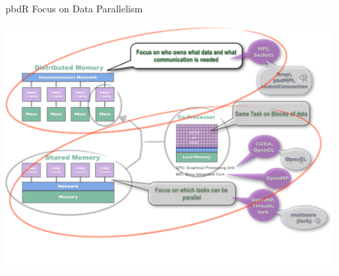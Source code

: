 \begin{frame}
\begin{block}{pbdR Focus on Data Parallelism}
    
\includegraphics[width=0.95\textwidth]
{../common/pics/hardware/ParallelHardware11.pdf}
\end{block}
\end{frame}